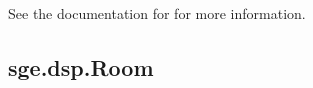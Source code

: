 \documentclass[letterpaper,10pt,english]{sphinxmanual}
\begin{document}

\begin{fulllineitems}
\label{dsp:sge.dsp.Game.event_paused_close}
See the documentation for {\hyperref[dsp:sge.dsp.Game.event_close]{\emph{}}} for
more information.

\end{fulllineitems}



\subsection{sge.dsp.Room}
\label{dsp:sge-dsp-room}
\end{document}
